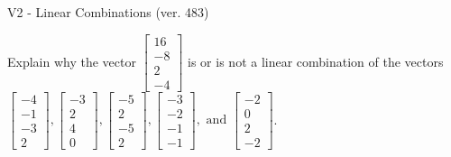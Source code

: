 \begin{exercise}
  \begin{exerciseTitle}V2 - Linear Combinations (ver. 483)\end{exerciseTitle}
  \begin{exerciseStatement}
    Explain why the vector \(\left[\begin{array}{c}
16 \\
-8 \\
2 \\
-4
\end{array}\right]\)  is or is not a linear 
	combination of the vectors \(\left[\begin{array}{c}
-4 \\
-1 \\
-3 \\
2
\end{array}\right] , \left[\begin{array}{c}
-3 \\
2 \\
4 \\
0
\end{array}\right] , \left[\begin{array}{c}
-5 \\
2 \\
-5 \\
2
\end{array}\right] , \left[\begin{array}{c}
-3 \\
-2 \\
-1 \\
-1
\end{array}\right] , \text{ and } \left[\begin{array}{c}
-2 \\
0 \\
2 \\
-2
\end{array}\right]\).
	



\end{exerciseStatement}
\end{exercise}
